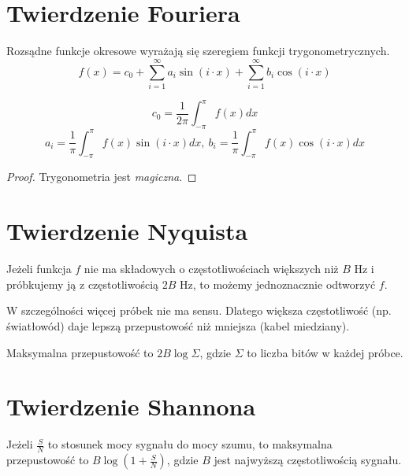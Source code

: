 \section{Twierdzenie Fouriera}
\begin{theorem}[Fourier]
	Rozsądne funkcje okresowe wyrażają się szeregiem funkcji trygonometrycznych.
	\[
		f(x) = c_0 + \sum_{i=1}^\infty a_i \sin(i \cdot x) + \sum_{i=1}^\infty b_i \cos(i \cdot x)
	\]

	\[
		c_0 = \frac{1}{2\pi} \int_{-\pi}^{\pi} f(x)dx
	\]
	\[
		a_i = \frac{1}{\pi} \int_{-\pi}^{\pi} f(x)\sin(i \cdot x) dx, \ b_i = \frac{1}{\pi} \int_{-\pi}^{\pi} f(x) \cos(i \cdot x) dx
	\]
\end{theorem}
\begin{proof}
	Trygonometria jest \textit{magiczna}.
\end{proof}

\section{Twierdzenie Nyquista}
\begin{theorem}[Nyquist]
	Jeżeli funkcja \(f\) nie ma składowych o częstotliwościach większych niż \(B\) Hz i próbkujemy ją z częstotliwością \(2B\) Hz, to możemy jednoznacznie odtworzyć \(f\).
\end{theorem}
W szczególności więcej próbek nie ma sensu. Dlatego większa częstotliwość (np. światłowód) daje lepszą przepustowość niż mniejsza (kabel miedziany).
\begin{corollary}
	Maksymalna przepustowość to \(2B\log\Sigma\), gdzie \(\Sigma\) to liczba bitów w każdej próbce.
\end{corollary}

\section{Twierdzenie Shannona}
\begin{theorem}[Shannon]
	Jeżeli \(\frac{S}{N}\) to stosunek mocy sygnału do mocy szumu, to maksymalna przepustowość to \(B \log(1+ \frac{S}{N})\), gdzie \(B\) jest najwyższą częstotliwością sygnału.
\end{theorem}


